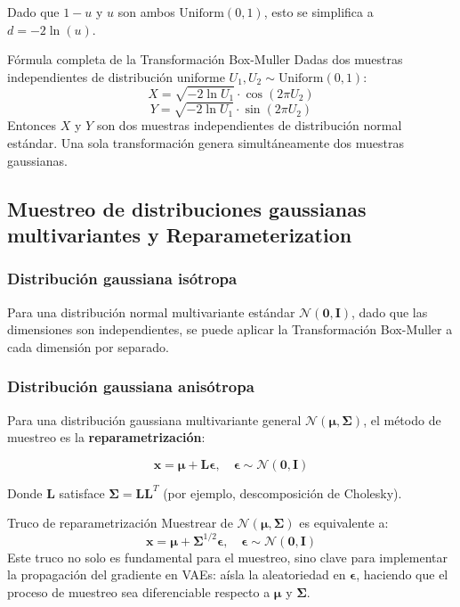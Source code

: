 Dado que $1-u$ y $u$ son ambos $\text{Uniform}(0,1)$, esto se simplifica a $d = -2\ln(u)$.

\begin{importantbox}{Fórmula completa de la Transformación Box-Muller}
Dadas dos muestras independientes de distribución uniforme $U_1, U_2 \sim \text{Uniform}(0,1)$:
$$X = \sqrt{-2\ln U_1} \cdot \cos(2\pi U_2)$$
$$Y = \sqrt{-2\ln U_1} \cdot \sin(2\pi U_2)$$
Entonces $X$ y $Y$ son dos muestras independientes de distribución normal estándar. Una sola transformación genera simultáneamente dos muestras gaussianas.
\end{importantbox}

\subsection{Muestreo de distribuciones gaussianas multivariantes y Reparameterization}

\subsubsection{Distribución gaussiana isótropa}

Para una distribución normal multivariante estándar $\mathcal{N}(\mathbf{0}, \mathbf{I})$, dado que las dimensiones son independientes, se puede aplicar la Transformación Box-Muller a cada dimensión por separado.

\subsubsection{Distribución gaussiana anisótropa}

Para una distribución gaussiana multivariante general $\mathcal{N}(\boldsymbol{\mu}, \boldsymbol{\Sigma})$, el método de muestreo es la \textbf{reparametrización}:

$$\mathbf{x} = \boldsymbol{\mu} + \mathbf{L} \boldsymbol{\epsilon}, \quad \boldsymbol{\epsilon} \sim \mathcal{N}(\mathbf{0}, \mathbf{I})$$

Donde $\mathbf{L}$ satisface $\boldsymbol{\Sigma} = \mathbf{L}\mathbf{L}^T$ (por ejemplo, descomposición de Cholesky).

\begin{importantbox}{Truco de reparametrización}
Muestrear de $\mathcal{N}(\boldsymbol{\mu}, \boldsymbol{\Sigma})$ es equivalente a:
$$\mathbf{x} = \boldsymbol{\mu} + \boldsymbol{\Sigma}^{1/2} \boldsymbol{\epsilon}, \quad \boldsymbol{\epsilon} \sim \mathcal{N}(\mathbf{0}, \mathbf{I})$$
Este truco no solo es fundamental para el muestreo, sino clave para implementar la propagación del gradiente en VAEs: aísla la aleatoriedad en $\boldsymbol{\epsilon}$, haciendo que el proceso de muestreo sea diferenciable respecto a $\boldsymbol{\mu}$ y $\boldsymbol{\Sigma}$.
\end{importantbox}

